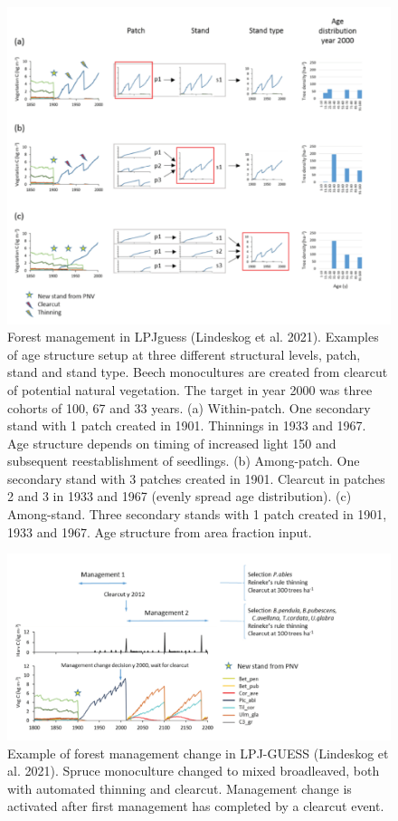 \documentclass[12pt,oneside]{book}
\begin{document}
\begin{figure}

{\centering \includegraphics[width=0.8\linewidth]{figures/chap8/f813_LPJ_manag1} 

}

\caption{Forest management in LPJguess (Lindeskog et al. 2021). Examples of age structure setup at three different structural levels, patch, stand and stand type. Beech monocultures are created from clearcut of potential natural vegetation. The target in year 2000 was three cohorts of 100, 67 and 33 years. (a) Within-patch. One secondary stand with 1 patch created in 1901. Thinnings in 1933 and 1967. Age structure depends on timing of increased light 150 and subsequent reestablishment of seedlings. (b) Among-patch. One secondary stand with 3 patches created in 1901. Clearcut in patches 2 and 3 in 1933 and 1967 (evenly spread age distribution). (c) Among-stand. Three secondary stands with 1 patch created in 1901, 1933 and 1967. Age structure from area fraction input.}\label{fig:f813}
\end{figure}

\begin{figure}

{\centering \includegraphics[width=0.8\linewidth]{figures/chap8/f814_LPJmanag2} 

}

\caption{Example of forest management change in LPJ-GUESS (Lindeskog et al. 2021). Spruce monoculture changed to mixed broadleaved, both with automated thinning and clearcut. Management change is activated after first management has completed by a clearcut event.}\label{fig:f814}
\end{figure}
\end{document}
